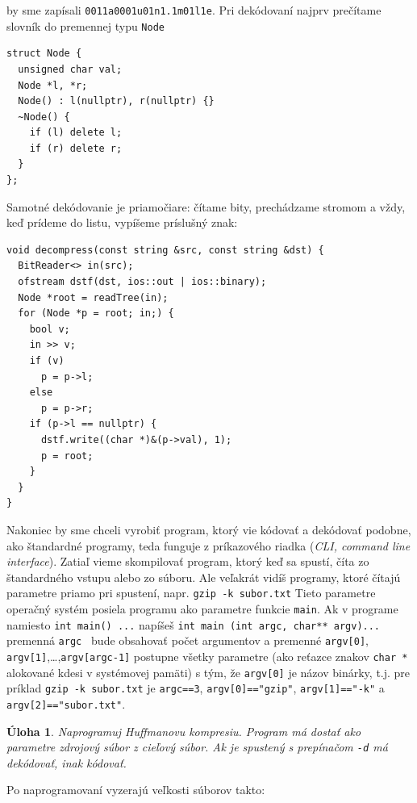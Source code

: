 \documentclass[10pt]{article}
\def\prg{\lstinline}
\def\ods{\vspace*{10pt}}
\newtheorem{uloha}{Úloha}
\begin{document}
{\ods
\stromzobrazka

\ods
by sme zapísali {\tt 0\textcolor{blue!60!white}{01\textvisiblespace1a}0001u01n1.1m01l1e}.
Pri dekódovaní najprv prečítame slovník do premennej typu {\tt *Node}

\begin{lstlisting}
struct Node {
  unsigned char val;
  Node *l, *r;
  Node() : l(nullptr), r(nullptr) {}
  ~Node() {
    if (l) delete l;
    if (r) delete r;
  }
};
\end{lstlisting}

Samotné dekódovanie je priamočiare: čítame bity, prechádzame stromom a vždy, keď prídeme
do listu, vypíšeme príslušný znak:

\begin{lstlisting}
void decompress(const string &src, const string &dst) {
  BitReader<> in(src);
  ofstream dstf(dst, ios::out | ios::binary);
  Node *root = readTree(in);
  for (Node *p = root; in;) {
    bool v;
    in >> v;
    if (v)
      p = p->l;
    else
      p = p->r;
    if (p->l == nullptr) {
      dstf.write((char *)&(p->val), 1);
      p = root;
    }
  }
}
\end{lstlisting}

\ods
Nakoniec by sme chceli vyrobiť program, ktorý vie kódovať a dekódovať podobne, ako 
štandardné programy, teda funguje z príkazového riadka ({\em CLI, command line interface}).
Zatiaľ vieme skompilovať program, ktorý keď sa spustí, číta zo štandardného vstupu
alebo zo súboru. Ale veľakrát vidíš programy, ktoré čítajú parametre
priamo pri spustení, napr. {\tt gzip -k subor.txt}
Tieto parametre operačný systém posiela programu ako parametre funkcie {\tt main}.
Ak v programe namiesto {\tt int main() ...} napíšeš {\tt int main (int argc, char** argv)...}
premenná {\tt argc } bude obsahovať počet argumentov a premenné {\tt argv[0]},
{\tt argv[1]},\ldots,{\tt argv[argc-1]} postupne všetky parametre (ako reťazce znakov 
\prg!char *! alokované kdesi v systémovej pamäti) s tým, že {\tt argv[0]} je názov
binárky, t.j. pre príklad {\tt gzip -k subor.txt} je \prg!argc==3!, \prg!argv[0]=="gzip"!,
\prg!argv[1]=="-k"! a \prg!argv[2]=="subor.txt"!.

\begin{uloha}
  Naprogramuj Huffmanovu kompresiu. Program má dostať ako parametre zdrojový súbor z cieľový
  súbor. Ak je spustený s prepínačom {\tt -d} má dekódovať, inak kódovať.
\end{uloha}

Po naprogramovaní vyzerajú veľkosti súborov takto:

}
\end{document}
